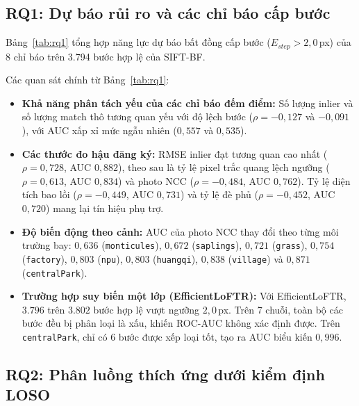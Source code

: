 \documentclass[conference]{IEEEtran}
\begin{document}
\subsection{RQ1: Dự báo rủi ro và các chỉ báo cấp bước}
\label{subsec:rq1_results}

Bảng~\ref{tab:rq1} tổng hợp năng lực dự báo bất đồng cấp bước ($E_{step} > 2{,}0$\,px) của 8 chỉ báo trên 3.794 bước hợp lệ của SIFT-BF.

\begin{table}[h]
\centering
\caption{Đánh giá năng lực dự báo lỗi đăng ký cấp bước cho SIFT-BF (3.794 bước hợp lệ trên 8 chuỗi)}
\label{tab:rq1}
\footnotesize

\end{table}

Các quan sát chính từ Bảng~\ref{tab:rq1}:
\begin{itemize}
    \item \textbf{Khả năng phân tách yếu của các chỉ báo đếm điểm:} Số lượng inlier và số lượng match thô tương quan yếu với độ lệch bước ($\rho = -0{,}127$ và $-0{,}091$), với AUC xấp xỉ mức ngẫu nhiên ($0{,}557$ và $0{,}535$).
    \item \textbf{Các thước đo hậu đăng ký:} RMSE inlier đạt tương quan cao nhất ($\rho = 0{,}728$, AUC $0{,}882$), theo sau là tỷ lệ pixel trắc quang lệch ngưỡng ($\rho = 0{,}613$, AUC $0{,}834$) và photo NCC ($\rho = -0{,}484$, AUC $0{,}762$). Tỷ lệ diện tích bao lồi ($\rho = -0{,}449$, AUC $0{,}731$) và tỷ lệ đè phủ ($\rho = -0{,}452$, AUC $0{,}720$) mang lại tín hiệu phụ trợ.
    \item \textbf{Độ biến động theo cảnh:} AUC của photo NCC thay đổi theo từng môi trường bay: $0{,}636$ (\texttt{monticules}), $0{,}672$ (\texttt{saplings}), $0{,}721$ (\texttt{grass}), $0{,}754$ (\texttt{factory}), $0{,}803$ (\texttt{npu}), $0{,}803$ (\texttt{huangqi}), $0{,}838$ (\texttt{village}) và $0{,}871$ (\texttt{centralPark}).
    \item \textbf{Trường hợp suy biến một lớp (EfficientLoFTR):} Với EfficientLoFTR, $3.796$ trên $3.802$ bước hợp lệ vượt ngưỡng $2{,}0$\,px. Trên 7 chuỗi, toàn bộ các bước đều bị phân loại là xấu, khiến ROC-AUC không xác định được. Trên \texttt{centralPark}, chỉ có 6 bước được xếp loại tốt, tạo ra AUC biểu kiến $0{,}996$.
\end{itemize}

\subsection{RQ2: Phân luồng thích ứng dưới kiểm định LOSO}
\label{subsec:rq2_results}
\end{document}
